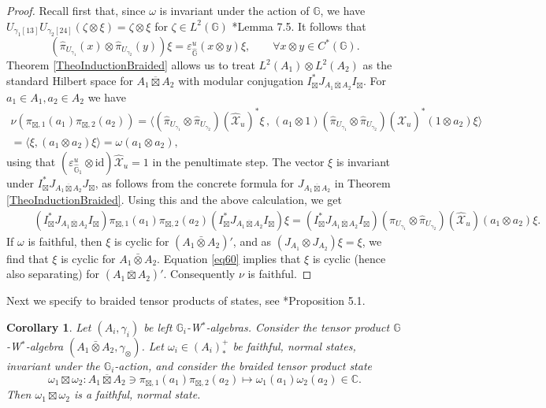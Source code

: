 \documentclass[reqno]{amsart}
\numberwithin{equation}{section}
\newtheorem{Cor}[Theorem]{Corollary}
\newcommand{\id}{\mathrm{id}}
\newcommand{\G}{\mathbb{G}}
\newcommand{\ov}{\overline}
\newcommand{\mc}{\mathcal}
\newcommand{\eps}{\varepsilon}
\newcommand{\wh}{\widehat}
\begin{document}
\begin{proof}
Recall first that, since $\omega$ is invariant under the action of $\G$,  we have $U_{\gamma_1 [13]} U_{\gamma_2 [24]} (\zeta\otimes \xi)=\zeta\otimes \xi$ for $\zeta\in L^2(\G)$ \cite{DCKr24}*{Lemma 7.5}. It follows that 
\[
(\hat{\pi}_{U_{\gamma_1}}(x)\otimes \hat{\pi}_{U_{\gamma_2}}(y))\xi=\eps^u_{\hat{\G}}(x\otimes y)\xi,\qquad \forall x\otimes y\in C^*(\G).
\] 
Theorem \ref{TheoInductionBraided} allows us to treat $L^2(A_1)\otimes L^2(A_2)$ as the standard Hilbert space for $A_1\ov\boxtimes A_2$ with modular conjugation $I_\boxtimes^* J_{A_1\ov\boxtimes A_2} I_\boxtimes$. For $a_1\in A_1,a_2\in A_2$ we have
\begin{multline*}
\nu(\pi_{\boxtimes,1}(a_1) \pi_{\boxtimes,2}(a_2))=
\bigl\langle 
(\hat{\pi}_{U_{\gamma_1}}\otimes \hat{\pi}_{U_{\gamma_2}})(\wh{\mc{X}}_u)^*\xi \,,\,
(a_1\otimes 1)
(\hat{\pi}_{U_{\gamma_1}}\otimes \hat{\pi}_{U_{\gamma_2}})(\wh{\mc{X}}_u)^* (1\otimes a_2)
\xi\bigr\rangle \\=
\langle \xi , (a_1\otimes a_2)\xi\rangle=
\omega(a_1\otimes a_2),
\end{multline*}
using that $(\eps^u_{\hat{\G}_1}\otimes \id)\wh{\mc{X}}_u=1$ in the penultimate step. The vector $\xi$ is invariant under $I_\boxtimes^* J_{A_1\ov\boxtimes A_2} J_\boxtimes$, as follows from the concrete formula for $J_{A_1\ov\boxtimes A_2}$ in Theorem \ref{TheoInductionBraided}. Using this and the above calculation, we get
\begin{equation}\begin{split}\label{eq60}
&\quad\;
(I_\boxtimes^* J_{A_1\ov\boxtimes A_2} I_\boxtimes)
\pi_{\boxtimes,1}(a_1) \pi_{\boxtimes,2}(a_2)
(I_\boxtimes^* J_{A_1\ov\boxtimes A_2} I_\boxtimes)\xi=
(I_\boxtimes^* J_{A_1\ov\boxtimes A_2} I_\boxtimes)
(\hat{\pi}_{U_{\gamma_1}}\otimes \hat{\pi}_{U_{\gamma_2}})(\wh{\mc{X}}_u) (a_1\otimes a_2)
\xi.
\end{split}\end{equation}
If $\omega$ is faithful, then $\xi$ is cyclic for $(A_1\bar\otimes A_2)'$, and as $(J_{A_1}\otimes J_{A_2})\xi=\xi$,  we find that $\xi$ is cyclic for $A_1\bar\otimes A_2$. Equation \eqref{eq60} implies that $\xi$ is cyclic (hence also separating) for $(A_1\ov\boxtimes A_2)'$. Consequently $\nu$ is faithful.
\end{proof}

Next we specify to braided tensor products of states, see \cite{DCKr24}*{Proposition 5.1}.

\begin{Cor}
Let $(A_i,\gamma_i)$ be left $\G_i$-W$^*$-algebras. Consider the tensor product $\G$-W$^*$-algebra $ (A_1\bar{\otimes}A_2,\!\gamma_{\otimes})$. Let $\omega_i\in (A_i)_*^+$ be faithful, normal states, invariant under the $\G_i$-action, and consider the braided tensor product state
\[
\omega_1\boxtimes \omega_2\colon A_1\ov\boxtimes A_2\ni \pi_{\boxtimes,1}(a_1)\pi_{\boxtimes,2}(a_2)\mapsto \omega_1(a_1) \omega_2(a_2)\in \mathbb{C}.
\]
Then $\omega_1\boxtimes \omega_2$ is a faithful, normal state.
\end{Cor}
\end{document}
